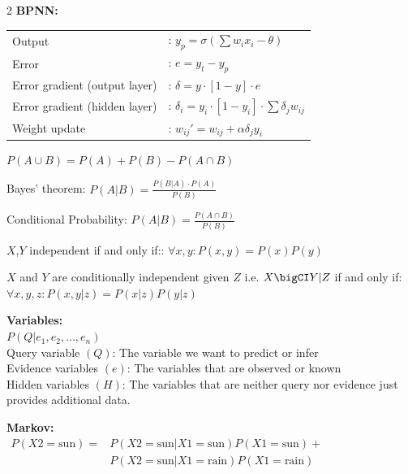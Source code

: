 \begin{multicols}{2}
\textbf{BPNN:}\\[0.5em]
\begin{tabular}{ll}
   Output &: $y_p = \sigma\left(\sum w_i x_i - \theta\right)$ \\
   Error &: $e = y_t - y_p$ \\
   Error gradient (output layer) &: $\delta = y \cdot [1-y] \cdot e$ \\
   Error gradient (hidden layer) &: $\delta_i = y_i \cdot [1-y_i] \cdot \sum \delta_j w_{ij}$ \\
   Weight update &: $w_{ij}' = w_{ij} + \alpha \delta_j y_i$ \\
\end{tabular}

$P(A \cup B) = P(A) + P(B) - P(A \cap B)$

Bayes' theorem: $P(A|B) = \frac{P(B|A) \cdot P(A)}{P(B)}$

Conditional Probability: $P(A|B) = \frac{P(A \cap B)}{P(B)}$

$X$,$Y$ independent if and only if:: $\forall x,y : P(x,y) = P(x)P(y)$

$X$ and $Y$ are conditionally independent given $Z$ i.e. $X \bigCI Y | Z$ if and only if: $\forall x,y,z : P(x,y|z) = P(x|z)P(y|z)$

\textbf{Variables:}\\[0.5em]
$P(Q|e_1, e_2, \ldots, e_n)$\\[0.5em]
Query variable $(Q)$: The variable we want to predict or infer\\
Evidence variables $(e)$: The variables that are observed or known\\
Hidden variables $(H)$: The variables that are neither query nor evidence just provides additional data.

\textbf{Markov:}\\[0.5em]
$\begin{aligned}
   P(X2=\text{sun})=
   & P(X2=\text{sun}|X1=\text{sun}) P(X1=\text{sun}) +\\
   & P(X2=\text{sun}|X1=\text{rain}) P(X1=\text{rain}) \\
\end{aligned}$


\end{multicols}
